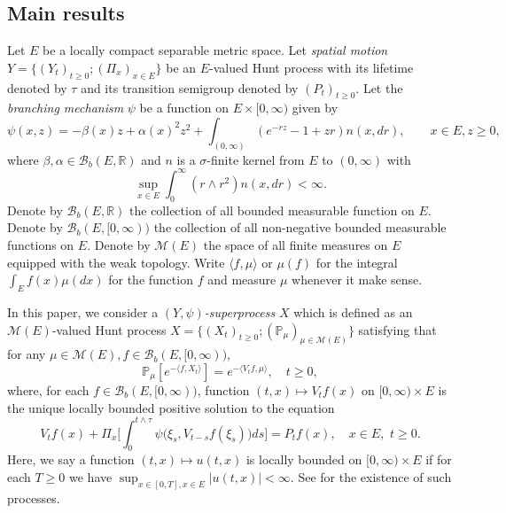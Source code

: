 \documentclass[12pt,a4paper]{amsart}
\numberwithin{equation}{section}
\theoremstyle{plain}
\theoremstyle{definition}
\begin{document}
\subsection{Main results}
\label{sec:main-results}
Let $E$ be a locally compact separable metric space. Let \emph{spatial motion}
$Y=\{(Y_t)_{t\geq 0};(\Pi_x)_{x\in E}\}$ be an $E$-valued Hunt process with its
lifetime denoted by $\tau$ and its transition semigroup denoted by $(P_t)_{t\geq
  0}$. 
Let the \emph{branching mechanism} $\psi$ be a function on
$E\times[0,\infty)$ given by
\[
	\psi(x,z)
	=-\beta(x)z + \alpha(x)^2 z^2+ \int_{(0,\infty)} (e^{-rz}-1+zr )n(x, dr),\qquad x\in E, z\geq0,
\]
where $\beta, \alpha\in \mathcal B_b(E,\mathbb R)$ and $n$ is a $\sigma$-finite kernel
from $E$ to $(0,\infty)$ with
\[
	\sup_{x\in E}\int_0^\infty (r\wedge r^2)n(x,dr)
	<\infty.
\]
Denote by $\mathcal B_b(E,\mathbb R)$ the collection of all bounded measurable function on
$E$. Denote by $\mathcal B_b(E, [0,\infty))$ the collection of all non-negative bounded
measurable functions on $E$. Denote by $\mathcal M(E)$ the space of all finite
measures on $E$ equipped with the weak topology. Write $\langle f,\mu\rangle$ or
$\mu(f)$ for the integral $\int_E f(x)\mu(dx)$ for the function $f$ and
measure $\mu$ whenever it make sense.
\par
In this paper, we consider a \emph{$(Y,\psi)$-superprocess} $X$ which is defined as an $\mathcal M(E)$-valued Hunt process $X=\{(X_t)_{t\geq 0}; (\mathbb
P_\mu)_{\mu \in \mathcal M(E)}\}$ satisfying that for any $\mu \in \mathcal M(E), f\in \mathcal B_b(E, [0,\infty))$,
\begin{equation}
  \label{eq:_def_of_vtf}
  \mathbb P_\mu [e^{-\langle f,X_t\rangle}] = e^{-\langle V_tf, \mu\rangle},
  \quad t\geq 0,
\end{equation}
where, for each $f\in\mathcal B_b(E, [0,\infty))$, function $(t,x) \mapsto V_tf(x)$ on $[0,\infty) \times E$ is the unique locally bounded positive solution to the
equation
\begin{equation}\label{eq:FKPP_in_definition}
  V_t f(x) +   \Pi_x\Big[\int_0^{t\wedge \tau} \psi \big(\xi_s,V_{t-s} f(\xi_s)\big) ds\Big]
	= P_t f(x),
	\quad x \in E,\,\, t \geq 0.
\end{equation}
Here, we say a function $(t,x)\mapsto u(t,x)$ is locally bounded on $[0,\infty) \times E$ if for each $T\geq 0$ we have $\sup_{x\in [0,T],x\in E} |u(t,x)| < \infty$. 
See \cite[Theorem 5.11]{Li2011Measurevalued} for the existence of such processes.
\end{document}
